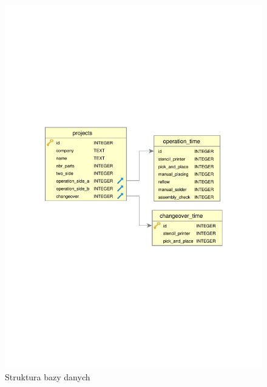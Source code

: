 \begin{figure}[H]
	\centering
	\includegraphics[scale=0.9]{chapters/chapter4/db_crop.pdf}
	\caption{Struktura bazy danych}
	\label{baza_danych}
\end{figure}

